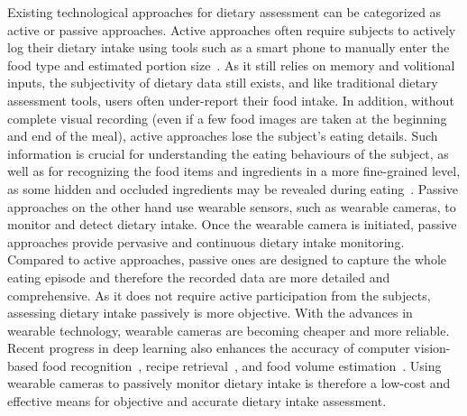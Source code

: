 \documentclass[journal]{IEEEtran}
\begin{document}
Existing technological approaches for dietary assessment can be categorized as active or passive approaches. Active approaches often require subjects to actively log their dietary intake using tools such as a smart phone to manually enter the food type and estimated portion size~\cite{lee2017use,wellard2019relative,lemacks2019dietary}. As it still relies on memory and volitional inputs, the subjectivity of dietary data still exists, and like traditional dietary assessment tools, users often under-report their food intake. In addition, without complete visual recording (even if a few food images are taken at the beginning and end of the meal), active approaches lose the subject's eating details. Such information is crucial for understanding the eating behaviours of the subject, as well as for recognizing the food items and ingredients in a more fine-grained level, as some hidden and occluded ingredients may be revealed during eating~\cite{qiu2020counting}. Passive approaches on the other hand use wearable sensors, such as wearable cameras, to monitor and detect dietary intake. Once the wearable camera is initiated, passive approaches provide pervasive and continuous dietary intake monitoring. Compared to active approaches, passive ones are designed to capture the whole eating episode and therefore the recorded data are more detailed and comprehensive. As it does not require active participation from the subjects, assessing dietary intake passively is more objective. With the advances in wearable technology, wearable cameras are becoming cheaper and more reliable. Recent progress in deep learning also enhances the accuracy of computer vision-based food recognition~\cite{bossard2014food,yanai2015food,martinel2018wide,qiu2019mining,min2019ingredient}, recipe retrieval~\cite{chen2016deep,min2016being,salvador2017learning,carvalho2018cross,marin2019recipe1m+,wang2019learning,zhu2019r2gan}, and food volume estimation~\cite{meyers2015im2calories,lo2018food,lo2019point2volume}. Using wearable cameras to passively monitor dietary intake is therefore a low-cost and effective means for objective and accurate dietary intake assessment.
\end{document}
